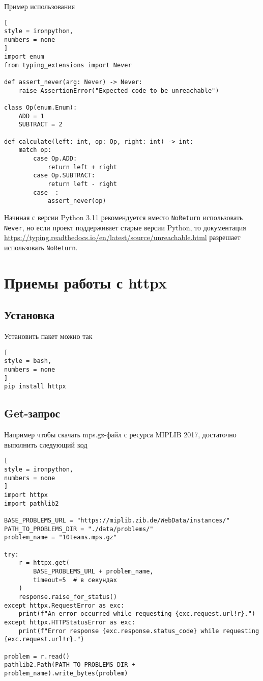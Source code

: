 \documentclass[%
	11pt,
	a4paper,
	utf8,
		]{article}
\begin{document}
Пример использования
\begin{lstlisting}[
style = ironpython,
numbers = none
]
import enum
from typing_extensions import Never

def assert_never(arg: Never) -> Never:
	raise AssertionError("Expected code to be unreachable")

class Op(enum.Enum):
	ADD = 1
	SUBTRACT = 2

def calculate(left: int, op: Op, right: int) -> int:
	match op:
		case Op.ADD:
			return left + right
		case Op.SUBTRACT:
			return left - right
		case _:
			assert_never(op)
\end{lstlisting}

Начиная с версии Python 3.11 рекомендуется вместо \verb*|NoReturn| использовать \verb*|Never|, но если проект поддерживает старые версии Python, то документация \url{https://typing.readthedocs.io/en/latest/source/unreachable.html} разрешает использовать \verb*|NoReturn|.

\section{Приемы работы с httpx}

\subsection{Установка}

Установить пакет можно так
\begin{lstlisting}[
style = bash,
numbers = none
]
pip install httpx
\end{lstlisting}

\subsection{Get-запрос}

Например чтобы скачать mps.gz-файл с ресурса MIPLIB 2017, достаточно выполнить следующий код
\begin{lstlisting}[
style = ironpython,
numbers = none
]
import httpx
import pathlib2

BASE_PROBLEMS_URL = "https://miplib.zib.de/WebData/instances/"
PATH_TO_PROBLEMS_DIR = "./data/problems/"
problem_name = "10teams.mps.gz"

try:
	r = httpx.get(
	    BASE_PROBLEMS_URL + problem_name,
	    timeout=5  # в секундах
	)
	response.raise_for_status()
except httpx.RequestError as exc:
    print(f"An error occurred while requesting {exc.request.url!r}.")
except httpx.HTTPStatusError as exc:
    print(f"Error response {exc.response.status_code} while requesting {exc.request.url!r}.")

problem = r.read()
pathlib2.Path(PATH_TO_PROBLEMS_DIR + problem_name).write_bytes(problem)
\end{lstlisting}
\end{document}
